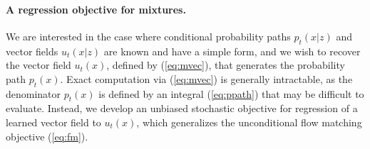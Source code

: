 \documentclass[10pt]{article}
\theoremstyle{plain}
\theoremstyle{definition}
\theoremstyle{remark}
\begin{document}
\paragraph{A regression objective for mixtures.}

We are interested in the case where conditional probability paths $p_t(x|z)$ and vector fields $u_t(x|z)$ are known and have a simple form, and we wish to recover the vector field $u_t(x)$, defined by (\ref{eq:mvec}), that generates the probability path $p_t(x)$. Exact computation via (\ref{eq:mvec}) is generally intractable, as the denominator $p_t(x)$ is defined by an integral (\ref{eq:ppath}) that may be difficult to evaluate. Instead, we develop an unbiased stochastic objective for regression of a learned vector field to $u_t(x)$, which generalizes the unconditional flow matching objective (\ref{eq:fm}).
\end{document}
